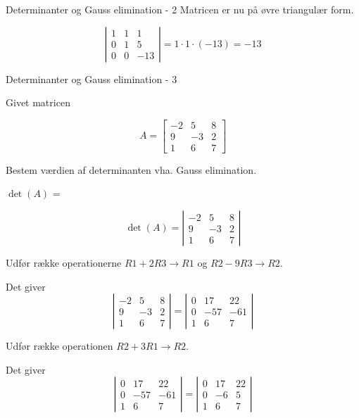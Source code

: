 \documentclass{article}
\begin{document}
\begin{exercise}{Determinanter og Gauss elimination - 2}
\hint
Matricen er nu på øvre triangulær form.

\hint
\[
\left|\begin{array}{rrr}
1 & 1 & 1 \\
0 & 1 & 5 \\
0 & 0 & -13
\end{array} \right|
= 1 \cdot 1 \cdot (-13) = -13
\]

\end{exercise}


\begin{exercise}{Determinanter og Gauss elimination - 3}

Givet matricen

\[
A = \left[\begin{array}{rrr}
-2 & 5 & 8 \\
9 & -3 & 2 \\
1 & 6 & 7
\end{array} \right]
\]

Bestem værdien af determinanten vha. Gauss elimination.

$\det(A)$ = 


\hint
\[
\det(A) = \left|\begin{array}{rrr}
-2 & 5 & 8 \\
9 & -3 & 2 \\
1 & 6 & 7
\end{array} \right|
\]


\hint
Udfør række operationerne
$R1 + 2R3 \to R1$ og
$R2 - 9R3 \to R2$.

\hint
Det giver
\[
\left|\begin{array}{rrr}
-2 & 5 & 8 \\
9 & -3 & 2 \\
1 & 6 & 7
\end{array} \right|
=
\left|\begin{array}{rrr}
0 & 17 & 22 \\
0 & -57 & -61 \\
1 & 6 & 7
\end{array} \right|
\]

\hint
Udfør række operationen
$R2 + 3R1 \to R2$.

\hint
Det giver
\[
\left|\begin{array}{rrr}
0 & 17 & 22 \\
0 & -57 & -61 \\
1 & 6 & 7
\end{array} \right|
=
\left|\begin{array}{rrr}
0 & 17 & 22 \\
0 & -6 & 5 \\
1 & 6 & 7
\end{array} \right|
\]


\end{exercise}
\end{document}

